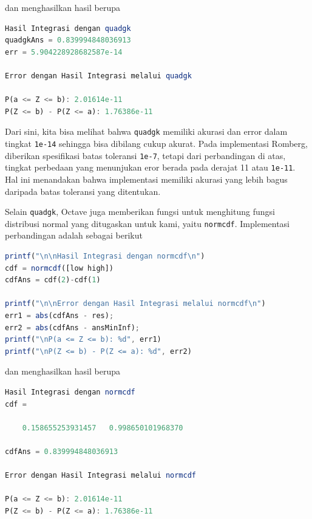 \documentclass[journal,12pt,onecolumn,a4paper]{IEEEtran}
\begin{document}
dan menghasilkan hasil berupa

\begin{center}
	\begin{lstlisting}[language=Octave]
Hasil Integrasi dengan quadgk
quadgkAns = 0.839994848036913
err = 5.904228928682587e-14

Error dengan Hasil Integrasi melalui quadgk

P(a <= Z <= b): 2.01614e-11
P(Z <= b) - P(Z <= a): 1.76386e-11
	\end{lstlisting}
\end{center}

Dari sini, kita bisa melihat bahwa \lstinline{quadgk} memiliki akurasi dan error dalam tingkat \lstinline{1e-14} sehingga bisa dibilang cukup akurat. Pada implementasi Romberg, diberikan spesifikasi batas toleransi \lstinline{1e-7}, tetapi dari perbandingan di atas, tingkat perbedaan yang menunjukan eror berada pada derajat 11 atau \lstinline{1e-11}.
Hal ini menandakan bahwa implementasi memiliki akurasi yang lebih bagus daripada batas toleransi yang ditentukan.

Selain \lstinline{quadgk}, Octave juga memberikan fungsi untuk menghitung fungsi distribusi normal yang ditugaskan untuk kami, yaitu \lstinline{normcdf}. Implementasi perbandingan adalah sebagai berikut

\begin{center}
	\begin{lstlisting}[language=Octave]
printf("\n\nHasil Integrasi dengan normcdf\n")
cdf = normcdf([low high])
cdfAns = cdf(2)-cdf(1)

printf("\n\nError dengan Hasil Integrasi melalui normcdf\n")
err1 = abs(cdfAns - res);
err2 = abs(cdfAns - ansMinInf);
printf("\nP(a <= Z <= b): %d", err1)
printf("\nP(Z <= b) - P(Z <= a): %d", err2)
	\end{lstlisting}
\end{center}

dan menghasilkan hasil berupa

\begin{center}
	\begin{lstlisting}[language=Octave]
Hasil Integrasi dengan normcdf
cdf =

	0.158655253931457   0.998650101968370

cdfAns = 0.839994848036913

Error dengan Hasil Integrasi melalui normcdf

P(a <= Z <= b): 2.01614e-11
P(Z <= b) - P(Z <= a): 1.76386e-11
	\end{lstlisting}
\end{center}
\end{document}
